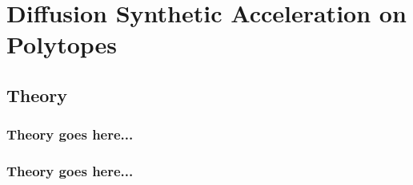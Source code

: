 \documentclass[compress,10pt]{beamer}
\begin{document}
\section[DSA on Polytopes]{Diffusion Synthetic Acceleration on Polytopes}
\subsection{Theory}
\typeout{***********************************************************************************}
\begin{frame}[t]\frametitle{Theory goes here...}

\end{frame}
\begin{frame}[t]\frametitle{Theory goes here...}

\end{frame}
\end{document}
